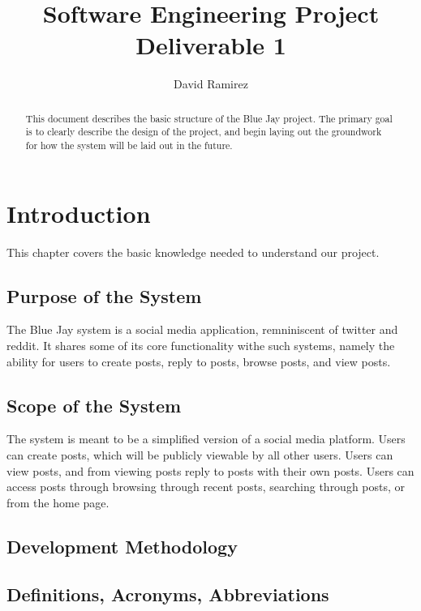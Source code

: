 \documentclass[letter,12pt]{report}
\begin{document}
\title{Software Engineering Project\\Deliverable 1}
\author{David Ramirez}
\date{}
\maketitle

\tableofcontents

\begin{abstract}
This document describes the basic structure of the Blue Jay project.
The primary goal is to clearly describe the design of the project,
and begin laying out the groundwork for how the system will be laid out
in the future.
\end{abstract}



\chapter{Introduction}
This chapter covers the basic knowledge needed to understand our project.

\section{Purpose of the System}
The Blue Jay system is a social media application,
remniniscent of twitter and reddit. It shares some of its
core functionality withe such systems, namely the ability for users
to create posts, reply to posts, browse posts, and view posts.


\section{Scope of the System}
The system is meant to be a simplified version of a social media platform.
Users can create posts, which will be publicly viewable by all other users.
Users can view posts, and from viewing posts reply to posts with their own
posts.
Users can access posts through browsing through recent posts, searching
through posts, or from the home page.



\section{Development Methodology}

\section{Definitions, Acronyms, Abbreviations}
\end{document}
